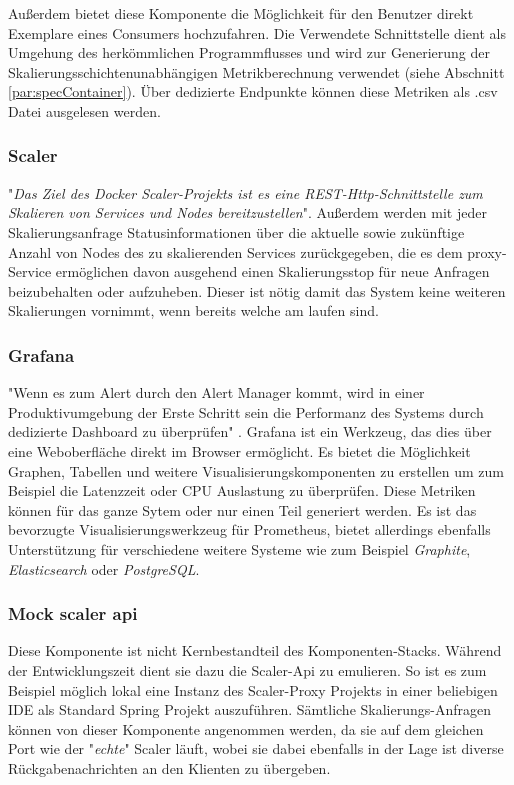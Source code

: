 Außerdem bietet diese Komponente die Möglichkeit für den Benutzer direkt Exemplare eines Consumers hochzufahren. Die Verwendete Schnittstelle dient als Umgehung des herkömmlichen Programmflusses und wird zur Generierung der Skalierungsschichtenunabhängigen Metrikberechnung verwendet (siehe Abschnitt \ref{par:specContainer}). Über dedizierte Endpunkte können diese Metriken als .csv Datei ausgelesen werden. 


\subsubsection{Scaler}
"\emph{Das Ziel des Docker Scaler-Projekts ist es eine REST-Http-Schnittstelle zum Skalieren von Services und Nodes bereitzustellen}"\cite{docker-scaler}. Außerdem werden mit jeder Skalierungsanfrage Statusinformationen über die aktuelle sowie zukünftige Anzahl von Nodes des zu skalierenden Services zurückgegeben, die es dem proxy-Service ermöglichen davon ausgehend einen Skalierungsstop für neue Anfragen beizubehalten oder aufzuheben. Dieser ist nötig damit das System keine weiteren Skalierungen vornimmt, wenn bereits welche am laufen sind.


\subsubsection{Grafana}
"Wenn es zum Alert durch den Alert Manager kommt, wird in einer Produktivumgebung der Erste Schritt sein die Performanz des Systems durch dedizierte Dashboard zu überprüfen" \cite[Kapitel~6]{oreillyPrometheus}. Grafana ist ein Werkzeug, das dies über eine Weboberfläche direkt im Browser ermöglicht. Es bietet die Möglichkeit Graphen, Tabellen und weitere Visualisierungskomponenten zu erstellen um zum Beispiel die Latenzzeit oder CPU Auslastung zu überprüfen. Diese Metriken können für das ganze Sytem oder nur einen Teil generiert werden. Es ist das bevorzugte Visualisierungswerkzeug für Prometheus, bietet allerdings ebenfalls Unterstützung für verschiedene weitere Systeme wie zum Beispiel \emph{Graphite}, \emph{Elasticsearch} oder \emph{PostgreSQL}.


\subsubsection{Mock scaler api}
Diese Komponente ist nicht Kernbestandteil des Komponenten-Stacks. Während der Entwicklungszeit dient sie dazu die Scaler-Api zu emulieren. So ist es zum Beispiel möglich lokal eine Instanz des Scaler-Proxy Projekts in einer beliebigen IDE als Standard Spring Projekt auszuführen. Sämtliche Skalierungs-Anfragen können von dieser Komponente angenommen werden, da sie auf dem gleichen Port wie der "\emph{echte}" Scaler läuft, wobei sie dabei ebenfalls in der Lage ist diverse Rückgabenachrichten an den Klienten zu übergeben.



